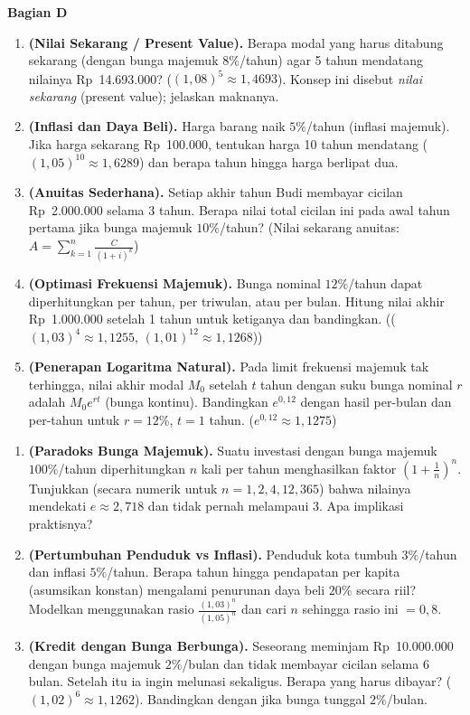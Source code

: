 \documentclass[11pt,a4paper]{report}
\theoremstyle{gaya}
\newcommand{\bagiansoal}[2]{%
  \par\medskip\noindent
  {\large\bfseries\color{biru}Bagian #1}\par\smallskip
  \addcontentsline{toc}{subsection}{Bagian #1}}
\begin{document}
\bagiansoal{D}{Expert (setara tahun pertama universitas --- sintesis antarbab)}
\begin{enumerate}[leftmargin=*]
  \item \textbf{(Nilai Sekarang / Present Value).} Berapa modal yang harus ditabung sekarang (dengan bunga majemuk $8\%$/tahun) agar 5 tahun mendatang nilainya Rp~14.693.000? ($(1{,}08)^5 \approx 1{,}4693$). Konsep ini disebut \emph{nilai sekarang} (present value); jelaskan maknanya.
  \item \textbf{(Inflasi dan Daya Beli).} Harga barang naik $5\%$/tahun (inflasi majemuk). Jika harga sekarang Rp~100.000, tentukan harga 10 tahun mendatang ($(1{,}05)^{10}\approx1{,}6289$) dan berapa tahun hingga harga berlipat dua.
  \item \textbf{(Anuitas Sederhana).} Setiap akhir tahun Budi membayar cicilan Rp~2.000.000 selama 3 tahun. Berapa nilai total cicilan ini pada awal tahun pertama jika bunga majemuk $10\%$/tahun? (Nilai sekarang anuitas: $A = \sum_{k=1}^{n} \frac{C}{(1+i)^k}$)
  \item \textbf{(Optimasi Frekuensi Majemuk).} Bunga nominal $12\%$/tahun dapat diperhitungkan per tahun, per triwulan, atau per bulan. Hitung nilai akhir Rp~1.000.000 setelah 1 tahun untuk ketiganya dan bandingkan. (($(1{,}03)^4\approx1{,}1255$, $(1{,}01)^{12}\approx1{,}1268$))
  \item \textbf{(Penerapan Logaritma Natural).} Pada limit frekuensi majemuk tak terhingga, nilai akhir modal $M_0$ setelah $t$ tahun dengan suku bunga nominal $r$ adalah $M_0 e^{rt}$ (bunga kontinu). Bandingkan $e^{0{,}12}$ dengan hasil per-bulan dan per-tahun untuk $r=12\%$, $t=1$ tahun. ($e^{0{,}12}\approx1{,}1275$)
\end{enumerate}

\begin{challenge}
\begin{enumerate}[leftmargin=*,topsep=2pt]
  \item \textbf{(Paradoks Bunga Majemuk).} Suatu investasi dengan bunga majemuk $100\%$/tahun diperhitungkan $n$ kali per tahun menghasilkan faktor $\left(1+\frac{1}{n}\right)^n$. Tunjukkan (secara numerik untuk $n=1,2,4,12,365$) bahwa nilainya mendekati $e \approx 2{,}718$ dan tidak pernah melampaui $3$. Apa implikasi praktisnya?
  \item \textbf{(Pertumbuhan Penduduk vs Inflasi).} Penduduk kota tumbuh $3\%$/tahun dan inflasi $5\%$/tahun. Berapa tahun hingga pendapatan per kapita (asumsikan konstan) mengalami penurunan daya beli $20\%$ secara riil? Modelkan menggunakan rasio $\frac{(1{,}03)^n}{(1{,}05)^n}$ dan cari $n$ sehingga rasio ini $= 0{,}8$.
  \item \textbf{(Kredit dengan Bunga Berbunga).} Seseorang meminjam Rp~10.000.000 dengan bunga majemuk $2\%$/bulan dan tidak membayar cicilan selama 6 bulan. Setelah itu ia ingin melunasi sekaligus. Berapa yang harus dibayar? ($(1{,}02)^6\approx1{,}1262$). Bandingkan dengan jika bunga tunggal $2\%$/bulan.
\end{enumerate}
\end{challenge}
\end{document}
